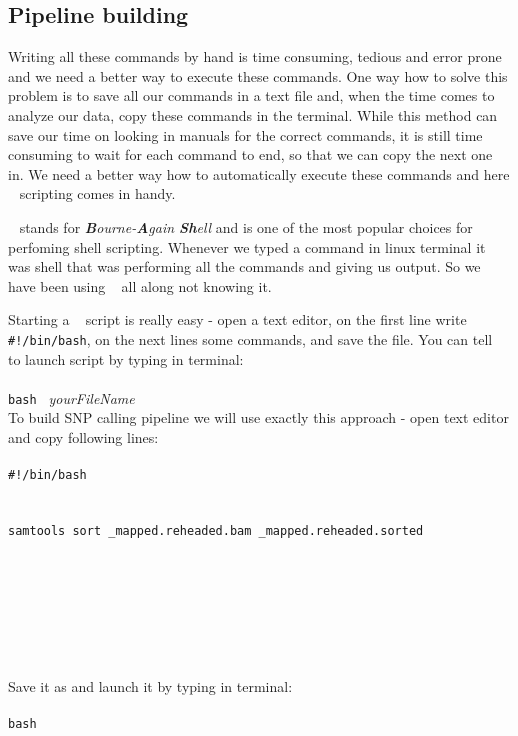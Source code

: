 \subsection{Pipeline building}
Writing all these commands by hand is time consuming, tedious and error prone
and we need a better way to execute these commands.
One way how to solve this problem is to save all our commands
in a text file and, when the time comes to analyze our data, copy these
commands in the terminal. While this method can save our time on looking
in manuals for the correct commands, it is still time consuming to wait
for each command to end, so that we can copy the next one in. 
We need a better way how to automatically execute these commands and
here \bash~ scripting comes in handy.

\bash~ stands for \textit{\textbf{B}ourne-\textbf{A}gain \textbf{Sh}ell}
and is one of the most popular choices for perfoming shell scripting. 
Whenever we typed a command in linux terminal it was shell that was
performing all the commands and giving us output.
So we have been using \bash~ all along not knowing it.

Starting a \bash~ script is really easy - open a text editor, on the
first line write \texttt{\#!/bin/bash}, on the next lines some commands,
and save the file. You can tell \bash~ to launch script by typing in terminal:\\~\\
\texttt{bash }\textit{ yourFileName}\\

To build SNP calling pipeline we will use exactly this approach -
open text editor and copy following lines:\\~\\
\texttt{\#!/bin/bash}\\
\\~\\
\texttt{samtools sort \mapReads\_mapped.reheaded.bam \mapReads\_mapped.reheaded.sorted}\\~\\
\texttt{}\\~\\
\\~\\
\\~\\

Save it as \texttt{\pipename} and launch it by typing in terminal:\\~\\
\texttt{bash \pipename}
